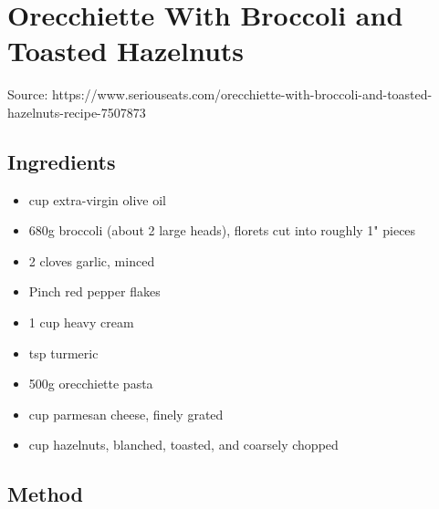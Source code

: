 \clearpage
\section{Orecchiette With Broccoli and Toasted Hazelnuts}


Source: https://www.seriouseats.com/orecchiette-with-broccoli-and-toasted-hazelnuts-recipe-7507873

\subsection{Ingredients}

\begin{itemize}
    \item {} cup extra-virgin olive oil
    \item 680g broccoli (about 2 large heads), florets cut into roughly 1" pieces
    \item 2 cloves garlic, minced
    \item Pinch red pepper flakes
    \item 1 cup heavy cream
    \item {} tsp turmeric
    \item 500g orecchiette pasta
    \item {} cup parmesan cheese, finely grated
    \item {} cup hazelnuts, blanched, toasted, and coarsely chopped
\end{itemize}

\subsection{Method}

